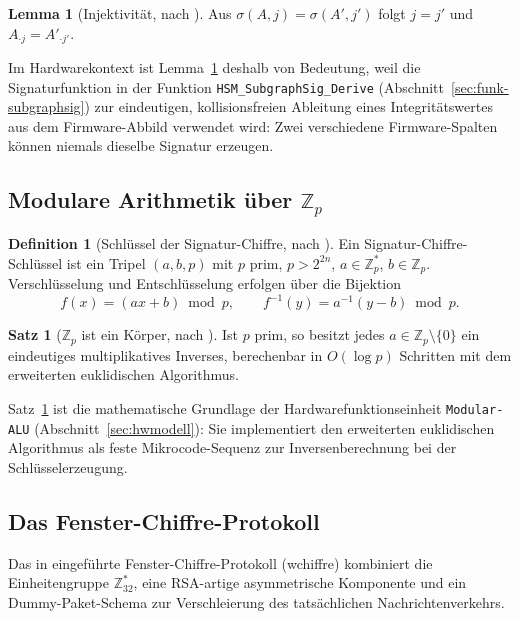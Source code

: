 ﻿\documentclass[a4paper,12pt]{article}
\theoremstyle{definition}
\newtheorem{definition}{Definition}
\newtheorem{satz}{Satz}
\newtheorem{lemma}{Lemma}
\begin{document}
\begin{lemma}[Injektivität, nach \cite{Epp26a,Epp26b}]
	\label{lem:inj}
	Aus $\sigma(A,j) = \sigma(A',j')$ folgt $j=j'$ und $A_{\cdot j} = A'_{\cdot j'}$.
\end{lemma}

Im Hardwarekontext ist Lemma~\ref{lem:inj} deshalb von Bedeutung, weil die Signaturfunktion in der Funktion \texttt{HSM\_SubgraphSig\_Derive} (Abschnitt~\ref{sec:funk-subgraphsig}) zur eindeutigen, kollisionsfreien Ableitung eines Integritätswertes aus dem Firmware-Abbild verwendet wird: Zwei verschiedene Firmware-Spalten können niemals dieselbe Signatur erzeugen.

\subsection{Modulare Arithmetik über $\mathbb{Z}_p$}

\begin{definition}[Schlüssel der Signatur-Chiffre, nach \cite{Epp26b}]
	\label{def:schluessel}
	Ein Signatur-Chiffre-Schlüssel ist ein Tripel $(a,b,p)$ mit $p$ prim, $p > 2^{2n}$, $a \in \mathbb{Z}_p^*$, $b \in \mathbb{Z}_p$. Verschlüsselung und Entschlüsselung erfolgen über die Bijektion
	\[
	f(x) = (ax+b) \bmod p, \qquad f^{-1}(y) = a^{-1}(y-b) \bmod p.
	\]
\end{definition}

\begin{satz}[$\mathbb{Z}_p$ ist ein Körper, nach \cite{Epp26b}]
	\label{satz:koerper}
	Ist $p$ prim, so besitzt jedes $a \in \mathbb{Z}_p \setminus \{0\}$ ein eindeutiges multiplikatives Inverses, berechenbar in $O(\log p)$ Schritten mit dem erweiterten euklidischen Algorithmus.
\end{satz}

Satz~\ref{satz:koerper} ist die mathematische Grundlage der Hardwarefunktionseinheit \texttt{Modular-ALU} (Abschnitt~\ref{sec:hwmodell}): Sie implementiert den erweiterten euklidischen Algorithmus als feste Mikrocode-Sequenz zur Inversenberechnung bei der Schlüsselerzeugung.

\subsection{Das Fenster-Chiffre-Protokoll}

Das in \cite{Epp26c} eingeführte Fenster-Chiffre-Protokoll (wchiffre) kombiniert die Einheitengruppe $\mathbb{Z}_{32}^*$, eine RSA-artige asymmetrische Komponente und ein Dummy-Paket-Schema zur Verschleierung des tatsächlichen Nachrichtenverkehrs.
\end{document}
